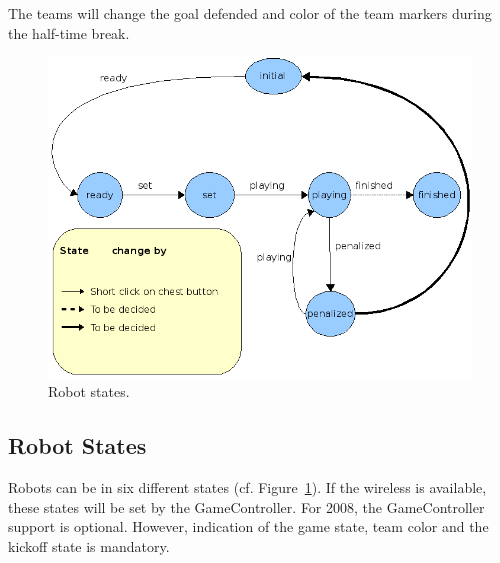 \documentclass[12pt]{article}
\newcommand{\cf}{\mbox{cf.}\xspace}
\begin{document}
The teams will change the goal defended and color of the team
markers during the half-time break.

\begin{figure}[t]
\centerline{\includegraphics[width=0.9\columnwidth]{figs/states.png}}
\caption{Robot states.}
\label{fig:robot_states}
\end{figure}

\subsection{Robot States}
\label{sec:robot_states}

Robots can be in six different states (\cf
Figure~\ref{fig:robot_states}). If the wireless is available, these
states will be set by the GameController. For 2008, the GameController support is optional. However, indication of the game state, team color and the kickoff state is mandatory.

\end{document}
